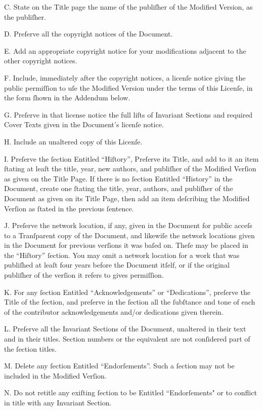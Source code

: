 C. State on the Title page the name of the publiſher of the
   Modified Version, as the publiſher.

D. Preſerve all the copyright notices of the Document.

E. Add an appropriate copyright notice for your modifications
   adjacent to the other copyright notices.

F. Include, immediately after the copyright notices, a licenſe notice
   giving the public permiſſion to uſe the Modified Version under the
   terms of this Licenſe, in the form ſhown in the Addendum below.

G. Preſerve in that license notice the full liſts of Invariant Sections
   and required Cover Texts given in the Document’s licenſe notice.

H. Include an unaltered copy of this Licenſe.

I. Preſerve the ſection Entitled “Hiſtory”, Preſerve its Title, and add
   to it an item ſtating at leaſt the title, year, new authors, and
   publiſher of the Modified Verſion as given on the Title Page. If
   there is no ſection Entitled “History” in the Document, create one
   ſtating the title, year, authors, and publiſher of the Document as
   given on its Title Page, then add an item deſcribing the Modified
   Verſion as ſtated in the previous ſentence.

J. Preſerve the network location, if any, given in the Document for
   public acceſs to a Tranſparent copy of the Document, and likewiſe
   the network locations given in the Document for previous verſions
   it was baſed on. Theſe may be placed in the “Hiſtory” ſection.
   You may omit a network location for a work that was publiſhed at
   leaſt four years before the Document itſelf, or if the original
   publiſher of the verſion it refers to gives permiſſion.

K. For any ſection Entitled “Acknowledgements” or “Dedications”,
   preſerve the Title of the ſection, and preſerve in the ſection all
   the ſubſtance and tone of each of the contributor acknowledgements
   and/or dedications given therein.

L. Preſerve all the Invariant Sections of the Document,
   unaltered in their text and in their titles. Section numbers
   or the equivalent are not conſidered part of the ſection titles.

M. Delete any ſection Entitled “Endorſements”. Such a ſection
   may not be included in the Modified Verſion.

N. Do not retitle any exiſting ſection to be Entitled “Endorſements"
   or to conflict in title with any Invariant Section.

